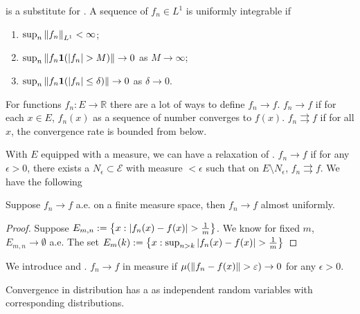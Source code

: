  is a substitute for . A sequence of \(f_{n} \in L^{1}\) is uniformly integrable if
\begin{enumerate}
    \item \(\sup_{n} \norm{f_{n}}_{L^{1}} < \infty\);
    \item \(\sup_{n} \norm{f_{n} \mathbf{1}(\abs{f_{n}}> M)} \to 0\) as \(M \to \infty\);
    \item \(\sup_{n} \norm{f_{n} \mathbf{1}(\abs{f_{n}}\leq \delta)} \to 0\) as \(\delta \to 0\).
\end{enumerate} 

For functions \(f_{n}: E \to \mathbb{R}\) there are a lot of ways to define \(f_{n} \to f\). 
\(f_{n} \to f\)  if for each \(x \in E\), \(f_{n}(x)\) as a sequence of number converges to \(f(x)\). \(f_{n} \rightrightarrows f\) if for all \(x\), the convergence rate is bounded from below. 

With \(E\) equipped with a measure, we can have a relaxation of . \(f_{n} \to f\)  if for any \(\epsilon> 0\), there exists a \(N_{\epsilon} \subset \mathcal{E}\) with measure \(< \epsilon\) such that on \(E\setminus N_{\epsilon}\), \(f_{n} \rightrightarrows f\). We have the following
\begin{thm}
    Suppose \(f_{n} \to f\) a.e. on a finite measure space, then \(f_{n} \to f\) almost uniformly. 
\end{thm}
\begin{proof}
    Suppose \(E_{m,n} := \Bqty{x: \abs{f_{n}(x) - f(x)} > \frac{1}{m}}\). We know for fixed \(m\), \(E_{m,n} \to \emptyset\) a.e. The set \(E_{m}(k):= \Bqty{x: \sup_{n > k} \abs{f_{n}(x) - f(x)} > \frac{1}{m}} \)  
\end{proof}

We introduce  and . \(f_{n} \to f\) in measure if \(\mu\pqty{\norm{f_{n} - f(x)} > \epsilon} \to 0\) for any \(\epsilon > 0\).

Convergence in distribution has a  as independent random variables with corresponding distributions. 

